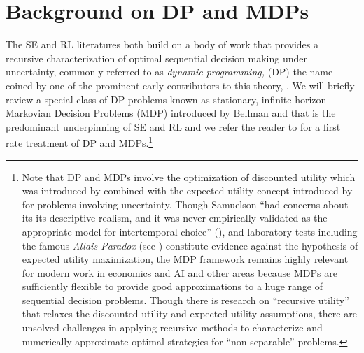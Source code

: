

\section{Background on DP and MDPs\label{sec:mdp}}

The SE and RL literatures both build on a body of work that provides a recursive characterization of  optimal sequential decision making
under uncertainty, commonly referred  to as {\it dynamic programming,\/} (DP) the name coined by one of the prominent
early contributors to this theory, \citet{Bellman:1957}. We will briefly review a special class of DP problems known
as stationary, infinite horizon Markovian Decision Problems (MDP) introduced by Bellman and \citet{Howard:1960} that is the
predominant underpinning of SE and RL and we refer the reader to \citet{bertsekas:2017} for a first rate treatment of DP and MDPs.\footnote{\footnotesize  
Note that DP and MDPs involve the optimization of  discounted utility which was introduced by
\citet{Samuelson:1937}  combined with the expected utility concept introduced by \citet{vnm:1944} for problems involving
uncertainty. Though Samuelson ``had concerns about its
its descriptive realism, and it was never empirically validated as the appropriate model for intertemporal choice'' (\citet{Loewenstein:2002}), 
and laboratory tests including the famous {\it Allais Paradox\/} (see \cite{Machina:1987}) constitute evidence against the hypothesis of expected utility maximization,
the MDP framework remains highly relevant for modern work in economics and AI and other areas because MDPs are sufficiently 
flexible to provide good approximations to a huge range of sequential decision problems. Though there is research
on ``recursive utility'' that relaxes the discounted
utility and expected utility assumptions, there are unsolved challenges in applying recursive methods 
to characterize and numerically approximate optimal strategies for ``non-separable'' problems.}


